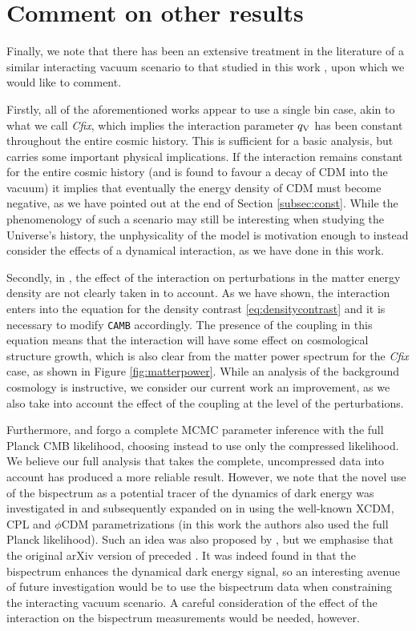 \documentclass[a4paper,fleqn,usenatbib]{mnras}
\begin{document}
\section{Comment on other results} \label{sec:rebuttal}
Finally, we note that there has been an extensive treatment in the literature of a similar interacting vacuum scenario to that studied in this work \citep{Kumar:2017dnp, Sola:2017znb, Sola:2017jbl, Tsiapi:2018she, Kumar:2019wfs}, upon which we would like to comment.

Firstly, all of the aforementioned works appear to use a single bin case, akin to what we call \textit{Cfix}, which implies the interaction parameter $q_{\rm V}$ has been constant throughout the entire cosmic history. This is sufficient for a basic analysis, but carries some important physical implications. If the interaction remains constant for the entire cosmic history (and is found to favour a decay of CDM into the vacuum) it implies that eventually the energy density of CDM must become negative, as we have pointed out at the end of Section \ref{subsec:const}. While the phenomenology of such a scenario may still be interesting when studying the Universe's history, the unphysicality of the model is motivation enough to instead consider the effects of a dynamical interaction, as we have done in this work.

Secondly, in \cite{Tsiapi:2018she}, the effect of the interaction on perturbations in the matter energy density are not clearly taken in to account. As we have shown, the interaction enters into the equation for the density contrast \eqref{eq:densitycontrast} and it is necessary to modify \texttt{CAMB} accordingly. The presence of the coupling in this equation means that the interaction will have some effect on cosmological structure growth, which is also clear from the matter power spectrum for the \textit{Cfix} case, as shown in Figure \ref{fig:matterpower}. While an analysis of the background cosmology is instructive, we consider our current work an improvement, as we also take into account the effect of the coupling at the level of the perturbations.

Furthermore, \cite{Sola:2017znb} and \cite{Sola:2017jbl} forgo a complete MCMC parameter inference with the full Planck CMB likelihood, choosing instead to use only the compressed likelihood. We believe our full analysis that takes the complete, uncompressed data into account has produced a more reliable result. However, we note that the novel use of the bispectrum as a potential tracer of the dynamics of dark energy was investigated in \cite{Sola:2017jbl} and subsequently expanded on in \cite{Sola2018:lcd} using the well-known XCDM, CPL and $\phi$CDM parametrizations (in this work the authors also used the full Planck likelihood). Such an idea was also proposed by \cite{Borges:2017jvi}, but we emphasise that the original arXiv version of \cite{Sola:2017jbl} preceded \cite{Borges:2017jvi}.  It was indeed found in \cite{Sola2018:lcd} that the bispectrum enhances the dynamical dark energy signal, so an interesting avenue of future investigation would be to use the bispectrum data when constraining the interacting vacuum scenario. A careful consideration of the effect of the interaction on the bispectrum measurements would be needed, however.
\end{document}
